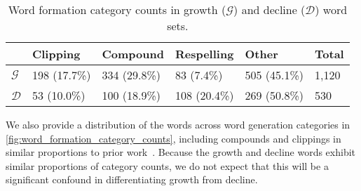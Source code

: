 \begin{table}
\small
\centering
\begin{tabular}{l p{1.1cm} p{1.1cm} p{1.1cm} p{0.9cm} l}
\toprule
 & Clipping & Compound & Respelling & Other & Total \\
\midrule
$\mathcal{G}$ & 198 (17.7\%) & 334 (29.8\%) & 83 (7.4\%) & 505 (45.1\%) & 1,120 \\ 
  $\mathcal{D}$ & 53 (10.0\%) & 100 (18.9\%) & 108 (20.4\%) & 269 (50.8\%) & 530 \\
  \bottomrule
\end{tabular}
\caption{Word formation category counts in growth ($\mathcal{G}$) and decline ($\mathcal{D}$) word sets.}
\label{fig:word_formation_category_counts}
\end{table}

We also provide a distribution of the words across word generation categories in \autoref{fig:word_formation_category_counts}, including compounds and clippings in similar proportions to prior work~\cite{kulkarni2018}.
Because the growth and decline words exhibit similar proportions of category counts, we do not expect that this will be a significant confound in differentiating growth from decline.



